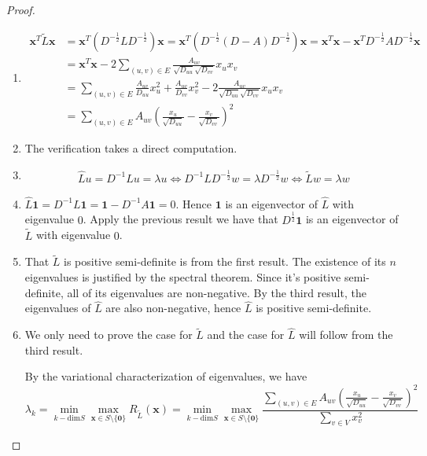 \documentclass[a4paper]{article}
\theoremstyle{definition}
\begin{document}
\begin{proof}
\hfill
\begin{enumerate}
    \item \begin{align}\textbf{x}^{T}\tilde{L}\textbf{x}&=\textbf{x}^{T}(D^{-\frac{1}{2}}LD^{-\frac{1}{2}})\textbf{x}=\textbf{x}^{T}(D^{-\frac{1}{2}}(D-A)D^{-\frac{1}{2}})\textbf{x}=\textbf{x}^{T}\textbf{x}-\textbf{x}^{T}D^{-\frac{1}{2}}AD^{-\frac{1}{2}}\textbf{x}\\
    &= \textbf{x}^{T}\textbf{x} - 2\sum_{(u, v)\in E}\frac{A_{uv}}{\sqrt{D_{uu}}\sqrt{D_{vv}}}x_u x_v\\
    &= \sum_{(u, v)\in E}\frac{A_{uv}}{D_{uu}}x_u^2 + \frac{A_{uv}}{D_{vv}}x_v^2 - 2 \frac{A_{uv}}{\sqrt{D_{uu}}\sqrt{D_{vv}}}x_u x_v\\
    &= \sum_{(u, v)\in E} A_{uv} \left(\frac{x_u}{\sqrt{D_{uu}}}-\frac{x_v}{\sqrt{D_{vv}}}\right)^2\end{align}
    
    \item The verification takes a direct computation.
    
    \item \begin{align}\hat{L}u=D^{-1}Lu=\lambda u\Longleftrightarrow D^{-1}LD^{-\frac{1}{2}}w=\lambda D^{-\frac{1}{2}}w\Longleftrightarrow\tilde{L}w=\lambda w\end{align}
    
    \item $\hat{L}\textbf{1}=D^{-1}L\textbf{1}=\textbf{1}-D^{-1}A\textbf{1}=0$. Hence $\textbf{1}$ is an eigenvector of $\hat{L}$ with eigenvalue $0$. Apply the previous result we have that $D^{\frac{1}{2}}\textbf{1}$ is an eigenvector of $\tilde{L}$ with eigenvalue $0$.
    
    \item That $\tilde{L}$ is positive semi-definite is from the first result. The existence of its $n$ eigenvalues is justified by the spectral theorem. Since it's positive semi-definite, all of its eigenvalues are non-negative. By the third result, the eigenvalues of $\hat{L}$ are also non-negative, hence $\hat{L}$ is positive semi-definite. 
    
    \item We only need to prove the case for $\tilde{L}$ and the case for $\hat{L}$ will follow from the third result.
    
    By the variational characterization of eigenvalues, we have \begin{equation}\lambda_k=\min_{k-\text{dim}S}\max_{\textbf{x}\in S\setminus\{\textbf{0}\}}R_{\tilde{L}}(\textbf{x})=\min_{k-\text{dim}S}\max_{\textbf{x}\in S\setminus\{\textbf{0}\}}\frac{\sum_{(u, v)\in E} A_{uv} \left(\frac{x_u}{\sqrt{D_{uu}}}-\frac{x_v}{\sqrt{D_{vv}}}\right)^2}{\sum_{v\in V}x_v^2}\end{equation}
    

\end{enumerate}
\end{proof}
\end{document}
